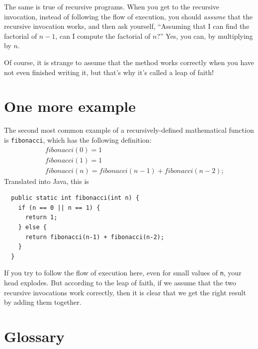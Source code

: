 \documentclass[12pt]{book}
\theoremstyle{exercise}
\begin{document}
The same is true of recursive programs.  When you get to
the recursive invocation, instead of following the flow of
execution, you should {\em assume} that the recursive invocation
works, and then ask yourself,
``Assuming that I can find the factorial of $n-1$, can I
compute the factorial of $n$?''  Yes, you can, by multiplying by $n$.

Of course, it is strange to assume that the method
works correctly when you have not even finished writing it,
but that's why it's called a leap of faith!


\section{One more example}
\label{fibonacci}

The second most common example of a recursively-defined
mathematical function is {\tt fibonacci}, which has the
following definition:
%
\begin{eqnarray*}
&& fibonacci(0) = 1 \\
&& fibonacci(1) = 1 \\
&& fibonacci(n) = fibonacci(n-1) + fibonacci(n-2);
\end{eqnarray*}
%
Translated into Java, this is

\begin{lstlisting}
  public static int fibonacci(int n) {
    if (n == 0 || n == 1) {
      return 1;
    } else {
      return fibonacci(n-1) + fibonacci(n-2);
    }
  }
\end{lstlisting}
%
If you try to follow the flow of execution here, even for small
values of {\tt n}, your head explodes.  But according to the leap of
faith, if we assume that the two recursive invocations work correctly, then
it is clear that we get the right result by adding them together.


\section{Glossary}
\end{document}
